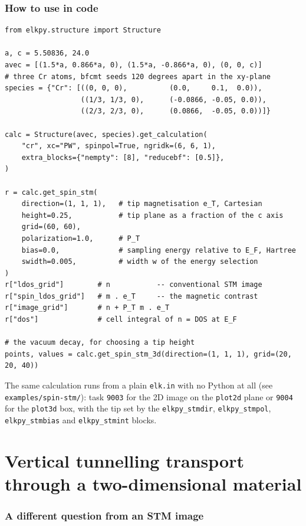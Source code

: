 \documentclass[11pt]{article}
\begin{document}
\section{How to use in code}

\begin{verbatim}
from elkpy.structure import Structure

a, c = 5.50836, 24.0
avec = [(1.5*a, 0.866*a, 0), (1.5*a, -0.866*a, 0), (0, 0, c)]
# three Cr atoms, bfcmt seeds 120 degrees apart in the xy-plane
species = {"Cr": [((0, 0, 0),          (0.0,     0.1,  0.0)),
                  ((1/3, 1/3, 0),      (-0.0866, -0.05, 0.0)),
                  ((2/3, 2/3, 0),      (0.0866,  -0.05, 0.0))]}

calc = Structure(avec, species).get_calculation(
    "cr", xc="PW", spinpol=True, ngridk=(6, 6, 1),
    extra_blocks={"nempty": [8], "reducebf": [0.5]},
)

r = calc.get_spin_stm(
    direction=(1, 1, 1),   # tip magnetisation e_T, Cartesian
    height=0.25,           # tip plane as a fraction of the c axis
    grid=(60, 60),
    polarization=1.0,      # P_T
    bias=0.0,              # sampling energy relative to E_F, Hartree
    swidth=0.005,          # width w of the energy selection
)
r["ldos_grid"]        # n           -- conventional STM image
r["spin_ldos_grid"]   # m . e_T     -- the magnetic contrast
r["image_grid"]       # n + P_T m . e_T
r["dos"]              # cell integral of n = DOS at E_F

# the vacuum decay, for choosing a tip height
points, values = calc.get_spin_stm_3d(direction=(1, 1, 1), grid=(20, 20, 40))
\end{verbatim}

The same calculation runs from a plain \texttt{elk.in} with no Python at all
(see \texttt{examples/spin-stm/}): task \texttt{9003} for the 2D image on the
\texttt{plot2d} plane or \texttt{9004} for the \texttt{plot3d} box, with the
tip set by the \texttt{elkpy\_stmdir}, \texttt{elkpy\_stmpol},
\texttt{elkpy\_stmbias} and \texttt{elkpy\_stmint} blocks.


\part{Vertical tunnelling transport through a two-dimensional material}
\label{part:transport}

\section{A different question from an STM image}
\end{document}

